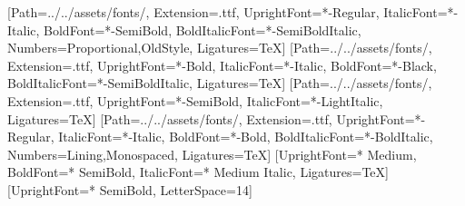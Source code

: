 \usepackage[a4paper,top=22mm,bottom=26mm,left=31mm,right=21mm,footskip=14mm]{geometry}
\usepackage{fontspec}
\usepackage{unicode-math}
\usepackage{xcolor}
\usepackage{graphicx}
\usepackage{tikz}
\usetikzlibrary{positioning,arrows.meta,shapes.geometric,calc,fit,backgrounds,decorations.pathmorphing,shadows}
\usepackage{eso-pic}
\usepackage{titlesec}
\usepackage{enumitem}
\usepackage{booktabs,tabularx,array,makecell,colortbl,multirow}
\usepackage[most]{tcolorbox}
\usepackage{microtype}
\usepackage{ragged2e}
\usepackage{caption}
\usepackage{float}
\usepackage{fancyhdr}
\usepackage{setspace}
\usepackage{xltabular}
\usepackage[hidelinks]{hyperref}
\usepackage{xurl}

\setmainfont{Newsreader}[Path=../../assets/fonts/, Extension=.ttf, UprightFont=*-Regular, ItalicFont=*-Italic,
  BoldFont=*-SemiBold, BoldItalicFont=*-SemiBoldItalic, Numbers={Proportional,OldStyle}, Ligatures=TeX]
\newfontfamily{}[Path=../../assets/fonts/, Extension=.ttf, UprightFont=*-Bold, ItalicFont=*-Italic,
  BoldFont=*-Black, BoldItalicFont=*-SemiBoldItalic, Ligatures=TeX]
\newfontfamily{}[Path=../../assets/fonts/, Extension=.ttf, UprightFont=*-SemiBold, ItalicFont=*-LightItalic, Ligatures=TeX]
\newfontfamily{}[Path=../../assets/fonts/, Extension=.ttf, UprightFont=*-Regular, ItalicFont=*-Italic,
  BoldFont=*-Bold, BoldItalicFont=*-BoldItalic, Numbers={Lining,Monospaced}, Ligatures=TeX]
\setsansfont{Inter}[UprightFont=* Medium, BoldFont=* SemiBold, ItalicFont=* Medium Italic, Ligatures=TeX]
\newfontfamily{}[UprightFont=* SemiBold, LetterSpace=14]

\pagecolor{paper}
\color{ink}

